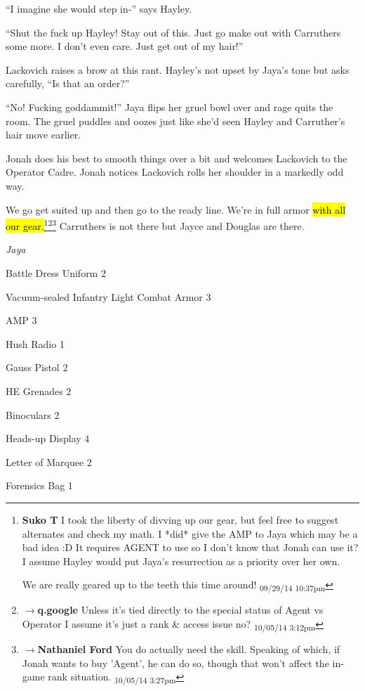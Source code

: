 ``I imagine she would step in-'' says Hayley.

``Shut the fuck up Hayley!  Stay out of this.  Just go make out with Carruthers some more.  I don't even care.  Just get out of my hair!''

Lackovich raises a brow at this rant.  Hayley's not upset by Jaya's tone but asks carefully, ``Is that an order?''

``No!  Fucking goddammit!''  Jaya flips her gruel bowl over and rage quits the room. The gruel puddles and oozes just like she'd seen Hayley and Carruther's hair move earlier.

Jonah does his best to smooth things over a bit and welcomes Lackovich to the Operator Cadre.  Jonah notices Lackovich rolls her shoulder in a markedly odd way.





We go get suited up and then go to the ready line.  We're in full armor \hl{with all our gear.}\footnote{\textbf{Suko T }I took the liberty of divving up our gear, but feel free to suggest alternates and check my math.  I *did* give the AMP to Jaya which may be a bad idea :D  It requires AGENT to use so I don't know that Jonah can use it?  I assume Hayley would put Jaya's resurrection as a priority over her own.

We are really geared up to the teeth this time around! \textsubscript{09/29/14 10:37pm}}\footnote{$\rightarrow$\textbf{q.google }Unless it's tied directly to the special status of Agent vs Operator I assume it's just a rank \& access issue no? \textsubscript{10/05/14 3:12pm}}\footnote{$\rightarrow$\textbf{Nathaniel Ford }You do actually need the skill. Speaking of which, if Jonah wants to buy 'Agent', he can do so, though that won't affect the in-game rank situation. \textsubscript{10/05/14 3:27pm}}  Carruthers is not there but Jayce and Douglas are there.



\textit{Jaya}

{\parskip=0pt
Battle Dress Uniform 2

Vacuum-sealed Infantry Light Combat Armor 3

AMP 3

Hush Radio 1

Gauss Pistol 2

HE Grenades 2

Binoculars 2

Heads-up Display 4

Letter of Marquee 2

Forensics Bag 1
}



